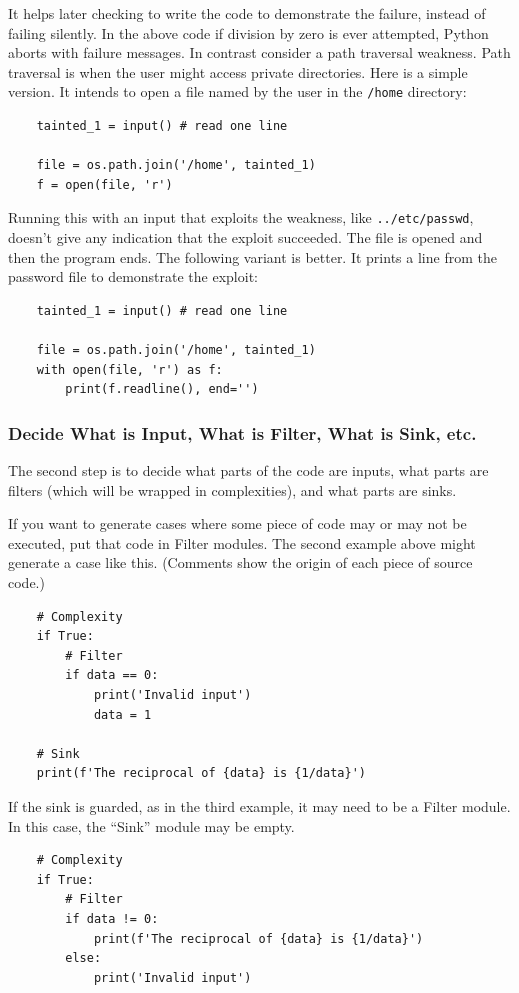It helps later checking to write the code to demonstrate the failure, instead of
failing silently.  In the above code if division by zero is ever attempted, Python
aborts with failure messages.  In contrast consider a path traversal weakness.  Path
traversal is when the user might access private directories.  Here is a simple
version.  It intends to open a file named by the user in the \verb|/home| directory:
\begin{verbatim}
    tainted_1 = input() # read one line

    file = os.path.join('/home', tainted_1)
    f = open(file, 'r')
\end{verbatim}
Running this with an input that exploits the weakness, like
\verb|../etc/passwd|, doesn't give any indication that the exploit succeeded.  The
file is opened and then the program ends.  The following variant is better.  It
prints a line from the password file to demonstrate the exploit:
\begin{verbatim}
    tainted_1 = input() # read one line

    file = os.path.join('/home', tainted_1)
    with open(file, 'r') as f:
        print(f.readline(), end='')
\end{verbatim}


\subsubsection{Decide What is Input, What is Filter, What is Sink, etc.}

The second step is to decide what parts of the code are inputs, what parts are
filters (which will be wrapped in complexities), and what parts are sinks.

If you want to generate cases where some piece of code may or may not be executed,
put that code in Filter modules.  The second example above might generate a case
like this.  (Comments show the origin of each piece of source code.)
\begin{verbatim}
    # Complexity
    if True:
        # Filter
        if data == 0:
            print('Invalid input')
            data = 1

    # Sink
    print(f'The reciprocal of {data} is {1/data}')
\end{verbatim}

If the sink is guarded, as in the third example, it may need to be a Filter module.
In this case, the ``Sink'' module may be empty.
\begin{verbatim}
    # Complexity
    if True:
        # Filter
        if data != 0:
            print(f'The reciprocal of {data} is {1/data}')
        else:
            print('Invalid input')
\end{verbatim}


